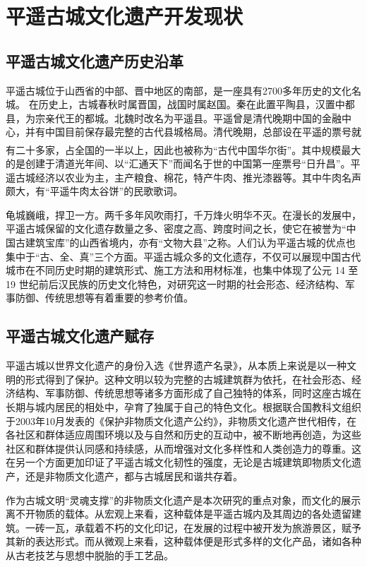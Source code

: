 \documentclass[UTF8]{ctexart}
\newcommand{\upcite}[1]{\textsuperscript{\textsuperscript{\cite{#1}}}}
\begin{document}
\section{平遥古城文化遗产开发现状}
    \subsection{平遥古城文化遗产历史沿革}
    平遥古城位于山西省的中部、晋中地区的南部，是一座具有2700多年历史的文化名城。 在历史上，古城春秋时属晋国，战国时属赵国。秦在此置平陶县，汉置中都县，为宗亲代王的都城。北魏时改名为平遥县。平遥曾是清代晚期中国的金融中心，并有中国目前保存最完整的古代县城格局。清代晚期，总部设在平遥的票号就有二十多家，占全国的一半以上，因此也被称为“古代中国华尔街”\upcite{秦晋2012平遥以中国}。其中规模最大的是创建于清道光年间、以“汇通天下”而闻名于世的中国第一座票号“日升昌”。平遥古城经济以农业为主，主产粮食、棉花，特产牛肉、推光漆器等。其中牛肉名声颇大，有“平遥牛肉太谷饼”的民歌歌词。

    龟城巍峨，捍卫一方。两千多年风吹雨打，千万烽火明华不灭。在漫长的发展中，平遥古城保留的文化遗存数量之多、密度之高、跨度时间之长，使它在被誉为“中国古建筑宝库”的山西省境内，亦有“文物大县”之称。人们认为平遥古城的优点也集中于“古、全、真”三个方面。平遥古城众多的文化遗存，不仅可以展现中国古代城市在不同历史时期的建筑形式、施工方法和用材标准，也集中体现了公元 14 至 19 世纪前后汉民族的历史文化特色，对研究这一时期的社会形态、经济结构、军事防御、传统思想等有着重要的参考价值。
    \subsection{平遥古城文化遗产赋存}
    平遥古城以世界文化遗产的身份入选《世界遗产名录》，从本质上来说是以一种文明的形式得到了保护。这种文明以较为完整的古城建筑群为依托，在社会形态、经济结构、军事防御、传统思想等诸多方面形成了自己独特的体系，同时这座古城在长期与城内居民的相处中，孕育了独属于自己的特色文化。根据联合国教科文组织于2003年10月发表的《保护非物质文化遗产公约》，非物质文化遗产世代相传，在各社区和群体适应周围环境以及与自然和历史的互动中，被不断地再创造，为这些社区和群体提供认同感和持续感，从而增强对文化多样性和人类创造力的尊重。这在另一个方面更加印证了平遥古城文化韧性的强度，无论是古城建筑即物质文化遗产，还是非物质文化遗产，都与古城居民和谐共存着。
    
    作为古城文明“灵魂支撑”的非物质文化遗产是本次研究的重点对象，而文化的展示离不开物质的载体。从宏观上来看，这种载体是平遥古城内及其周边的各处遗留建筑。一砖一瓦，承载着不朽的文化印记，在发展的过程中被开发为旅游景区，赋予其新的表达形式。而从微观上来看，这种载体便是形式多样的文化产品，诸如各种从古老技艺与思想中脱胎的手工艺品。
\end{document}
